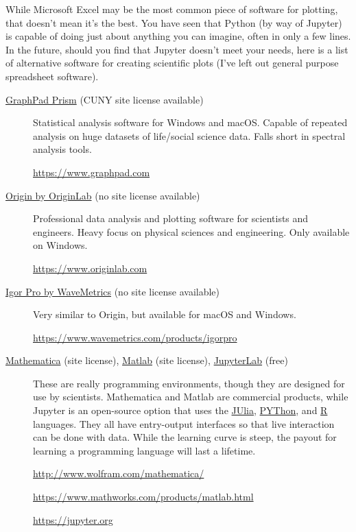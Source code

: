\documentclass[nobib,nofonts,nols,nohyper]{tufte-handout}
\begin{document}
While Microsoft Excel may be the most common piece of software for plotting,  that doesn't mean it's the best. 
You have seen that Python (by way of Jupyter) is capable of doing just about anything you can imagine, often in only a few lines. 
In the future, should you find that Jupyter doesn't meet your needs, here is a list of alternative software for creating scientific plots (I've left out general purpose spreadsheet software). 
\begin{description}
	\item[\href{https://www.graphpad.com}{GraphPad Prism} (CUNY site license available)] Statistical analysis software for Windows and macOS. 
	Capable of repeated analysis on huge datasets of life/social science data. 
	Falls short in spectral analysis tools.
	
	\url{https://www.graphpad.com}
	
	\item[\href{https://www.originlab.com}{Origin by OriginLab} (no site license available)] Professional data analysis and plotting software for scientists and engineers. 
	Heavy focus on physical sciences and engineering. 
	Only available on Windows. 
	
	\url{https://www.originlab.com}
	
	\item[\href{https://www.wavemetrics.com/products/igorpro}{Igor Pro by WaveMetrics} (no site license available)] Very similar to Origin, but available for macOS and Windows.
	
	\url{https://www.wavemetrics.com/products/igorpro}
	
	\item[\href{http://www.wolfram.com/mathematica/}{Mathematica} (site license), 
	\href{https://www.mathworks.com/products/matlab.html}{Matlab} (site license), 
	\href{https://jupyter.org}{JupyterLab} (free)] 
	These are really programming environments, though they are designed for use by scientists. Mathematica and Matlab are commercial products, while Jupyter is an open-source option that uses the \href{https://julialang.org}{JUlia},
  \href{https://www.python.org}{PYThon}, and \href{https://www.r-project.org}{R} languages. 
	They all have entry-output interfaces so that live interaction can be done with data. 
	While the learning curve is steep, the payout for learning a programming language will last a lifetime. 
	
	\url{http://www.wolfram.com/mathematica/}
	
	\url{https://www.mathworks.com/products/matlab.html}
	
	\url{https://jupyter.org}
	
\end{description}

\nocite{*}
\printbibliography[category=cited]%

\printbibliography[%
  title={Further Reading},%
  resetnumbers,%
  omitnumbers,%
	notcategory=cited,%
	]
\end{document}
